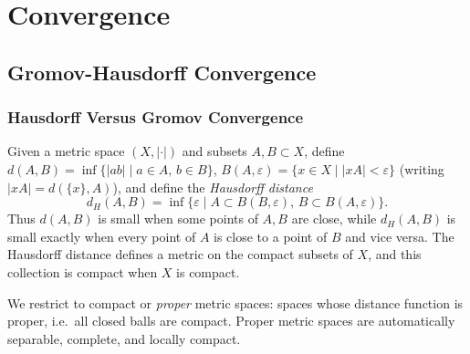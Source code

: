 \chapter{Convergence}
\label{chap:pet-convergence}

\newcommand{\Ric}{\operatorname{Ric}}
\newcommand{\Hess}{\operatorname{Hess}}
\newcommand{\vol}{\operatorname{vol}}
\newcommand{\diam}{\operatorname{diam}}
\newcommand{\inj}{\operatorname{inj}}
\newcommand{\sec}{\operatorname{sec}}
\newcommand{\Cap}{\operatorname{Cap}}
\newcommand{\Cov}{\operatorname{Cov}}
\newcommand{\dGH}{d_{G\text{-}H}}

\section{Gromov-Hausdorff Convergence}

\subsection{Hausdorff Versus Gromov Convergence}

\begin{definition}
  \label{def:pet-ch11-hausdorff-distance}

  Given a metric space $(X,|\cdot|)$ and subsets $A,B\subset X$, define
  $d(A,B)=\inf\{|ab|\mid a\in A,\,b\in B\}$,
  $B(A,\varepsilon)=\{x\in X\mid|xA|<\varepsilon\}$ (writing $|xA|=d(\{x\},A)$),
  and define the \emph{Hausdorff distance}
  \[
    d_H(A,B)=\inf\{\varepsilon\mid A\subset B(B,\varepsilon),\,B\subset B(A,\varepsilon)\}.
  \]
  Thus $d(A,B)$ is small when some points of $A,B$ are close, while
  $d_H(A,B)$ is small exactly when every point of $A$ is close to a point of
  $B$ and vice versa. The Hausdorff distance defines a metric on the compact
  subsets of $X$, and this collection is compact when $X$ is compact.
\end{definition}

\begin{convention}
  \label{conv:pet-ch11-compact-proper-spaces}

  We restrict to compact or \emph{proper} metric spaces:
  spaces whose distance function is proper, i.e.\ all closed balls are
  compact. Proper metric spaces are automatically separable, complete, and
  locally compact.
\end{convention}

